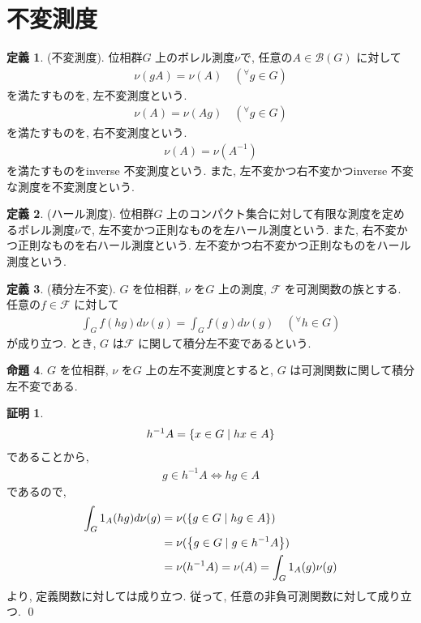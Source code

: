 \documentclass[10pt, fleqn, label-section=none]{bxjsarticle}
\theoremstyle{definition}
\newtheorem{dfn}{定義}[section]
\newtheorem{prop}[dfn]{命題}
\newtheorem*{pf*}{証明}
\newcommand{\any}{{}^{\forall}}
\newcommand{\cbra}[1]{\mleft\{#1\mright\}}
\newcommand{\LR}{\Leftrightarrow}
\renewcommand{\;}{\, ; \,}
\begin{document}
\section{不変測度}


\begin{dfn}(不変測度). 位相群$G$ 上のボレル測度$\nu$で,  任意の$A \in \mathcal B (G)$ に対して
\begin{align*} \nu(gA) = \nu(A) \quad (\any g \in G)\end{align*}
を満たすものを, 左不変測度という. 
\begin{align*} \nu(A) = \nu(Ag) \quad (\any g \in G)\end{align*}
を満たすものを, 右不変測度という. 
\begin{align*} \nu(A) = \nu(A^{-1}) \end{align*}
を満たすものをinverse 不変測度という. また, 左不変かつ右不変かつinverse 不変な測度を不変測度という.
\end{dfn}

\begin{dfn}(ハール測度). 位相群$G$ 上のコンパクト集合に対して有限な測度を定めるボレル測度$\nu$で, 左不変かつ正則なものを左ハール測度という. また, 右不変かつ正則なものを右ハール測度という. 左不変かつ右不変かつ正則なものをハール測度という.

\end{dfn}

\begin{dfn}(積分左不変). $G$ を位相群, $\nu$ を$G$ 上の測度, $\mathcal F$ を可測関数の族とする. 任意の$f \in \mathcal F$ に対して
\begin{align*} \int_G f (hg) d \nu(g) = \int_G f (g) d\nu(g) \quad (\any h \in G)\end{align*}
が成り立つ. とき, $G$ は$\mathcal F$ に関して積分左不変であるという.
\end{dfn}



\begin{prop} $G$ を位相群, $\nu$ を$G$ 上の左不変測度とすると, $G$ は可測関数に関して積分左不変である.
\end{prop}
\begin{pf*}
\begin{align*} h^{-1} A = \cbra{x \in G \mid hx \in A} \end{align*}
であることから, 
\begin{align*} g \in h^{-1}A  \LR hg \in A \end{align*}
であるので, 
\begin{align*} \int_G 1_A (hg) d\nu(g) &= \nu(\cbra{g \in G \mid hg \in A}) \\ 
&= \nu(\cbra{g \in G \mid g \in h^{-1}A }) \\
&= \nu(h^{-1}A) = \nu (A) = \int_G 1_A (g) \nu(g) 
\end{align*}
より, 定義関数に対しては成り立つ. 従って, 任意の非負可測関数に対して成り立つ.
\qed
\end{pf*}
\end{document}
